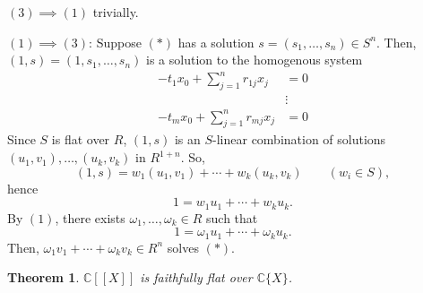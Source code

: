 \documentclass[12pt]{article}
\theoremstyle{theorem}            %
\newtheorem{theorem}{Theorem}[section]
\theoremstyle{definition}           %
\theoremstyle{empty}
\begin{document}
$(3)\implies (1)$ trivially.

$(1)\implies (3)$: Suppose $(*)$ has a solution $s=(s_1, \dots, s_n)\in S^n$.  Then, $(1, s)= (1, s_1, \dots, s_n)$ is a solution to the homogenous system
\begin{align*} -t_1x_0+\sum_{j=1}^n r_{1j}x_j &=  0  \\
				&\vdots     \tag{$**$} \\
		-t_mx_0 + \sum_{j=1}^n r_{mj}x_j  & =  0 \end{align*}
Since $S$ is flat over $R$, $(1, s)$ is an $S$-linear combination of solutions $(u_1, v_1), \dots, (u_k, v_k)$ in $R^{1+n}$. So,
$$(1, s) = w_1(u_1, v_1) + \cdots + w_k(u_k, v_k) \qquad (w_i\in S),$$
hence
$$1= w_1 u_1 + \cdots + w_k u_k.$$
By $(1)$, there exists $\omega_1, \dots, \omega_k\in R$ such that
$$1= \omega_1u_1 + \cdots + \omega_k u_k.$$
Then, $\omega_1v_1+\cdots + \omega_k v_k\in R^n$ solves $(*)$. 



\begin{theorem} $\mathds{C}[[X]]$ is faithfully flat over $\mathds{C}\{X\}$. \end{theorem}
\end{document}
